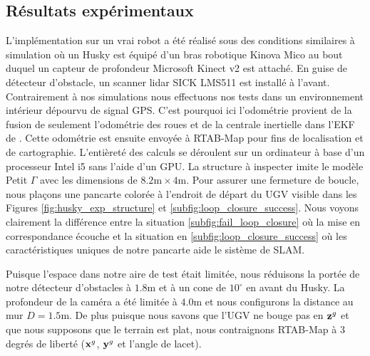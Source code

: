 \subsection{Résultats expérimentaux}

L'implémentation sur un vrai robot a été réalisé sous des conditions similaires à simulation où un Husky est équipé d'un bras robotique Kinova Mico au bout duquel un capteur de profondeur Microsoft Kinect v2 est attaché. En guise de détecteur d'obstacle, un scanner lidar SICK LMS511 est installé à l'avant. Contrairement à nos simulations nous effectuons nos tests dans un environnement intérieur dépourvu de signal GPS. C'est pourquoi ici l'odométrie provient de la fusion de seulement l'odométrie des roues et de la centrale inertielle dans l'EKF de \citep{MooreEkf2014}. Cette odométrie est ensuite envoyée à RTAB-Map \citep{Labbe2014} pour fins de localisation et de cartographie. L'entièreté des calculs se déroulent sur un ordinateur à base d'un processeur Intel i5 sans l'aide d'un GPU. La structure à inspecter imite le modèle Petit $\Gamma$ avec les dimensions de $8.2\text{m} \times 4\text{m}$. Pour assurer une fermeture de boucle, nous plaçons une pancarte colorée à l'endroit de départ du UGV visible dans les Figures \ref{fig:husky_exp_structure} et \ref{subfig:loop_closure_success}. Nous voyons clairement la différence entre la situation \ref{subfig:fail_loop_closure} où la mise en correspondance écouche et la situation en \ref{subfig:loop_closure_success} où les caractéristiques uniques de notre pancarte aide le sistème de SLAM.

Puisque l'espace dans notre aire de test était limitée, nous réduisons la portée de notre détecteur d'obstacles à $1.8$m et à un cone de $10^\circ$  en avant du Husky. La profondeur de la caméra a été limitée à $4.0$m et nous configurons la distance au mur $D=1.5$m. De plus puisque nous savons que l'UGV ne bouge pas en $\mathbf{z}^g$ et que nous supposons que le terrain est plat, nous contraignons RTAB-Map à $3$ degrés de liberté ($\mathbf{x}^g$, $\mathbf{y}^g$ et l'angle de lacet).

